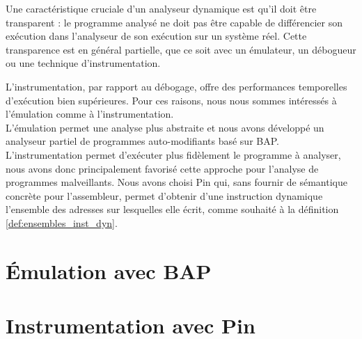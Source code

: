 Une caractéristique cruciale d'un analyseur dynamique est qu'il doit être transparent : le programme analysé ne doit pas être capable de différencier son exécution dans l'analyseur de son exécution sur un système réel.
Cette transparence est en général partielle, que ce soit avec un émulateur, un débogueur ou une technique d'instrumentation.

L'instrumentation, par rapport au débogage, offre des performances temporelles d'exécution bien supérieures.
Pour ces raisons, nous nous sommes intéressés à l'émulation comme à l'instrumentation.
\\

L'émulation permet une analyse plus abstraite et nous avons développé un analyseur partiel de programmes auto-modifiants basé sur BAP.
L'instrumentation permet d'exécuter plus fidèlement le programme à analyser, nous avons donc principalement favorisé cette approche pour l'analyse de programmes malveillants. Nous avons choisi Pin qui, sans fournir de sémantique concrète pour l'assembleur, permet d'obtenir d'une instruction dynamique l'ensemble des adresses sur lesquelles elle écrit, comme souhaité à la définition \ref{def:ensembles_inst_dyn}.



\section{Émulation avec BAP}


\section{Instrumentation avec Pin}


